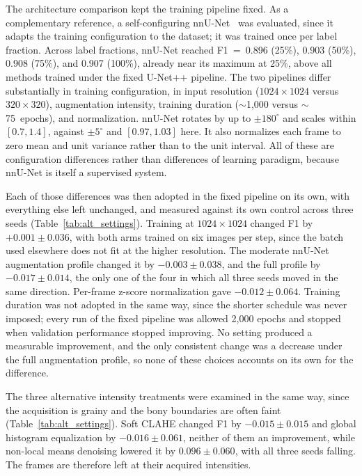\documentclass[
  msc,
  american
]{ThesisPUC_v2}
\begin{document}
The architecture comparison kept the training pipeline fixed. As a complementary reference, a self-configuring nnU-Net~\citep{ref_nnunet} was evaluated, since it adapts the training configuration to the dataset; it was trained once per label fraction. Across label fractions, nnU-Net reached F1~=~0.896 (25\%), 0.903 (50\%), 0.908 (75\%), and 0.907 (100\%), already near its maximum at 25\%, above all methods trained under the fixed U-Net++ pipeline. The two pipelines differ substantially in training configuration, in input resolution ($1024 \times 1024$ versus $320 \times 320$), augmentation intensity, training duration (${\sim}$1{,}000 versus ${\sim}$75~epochs), and normalization. nnU-Net rotates by up to $\pm 180^\circ$ and scales within $[0.7, 1.4]$, against $\pm 5^\circ$ and $[0.97, 1.03]$ here. It also normalizes each frame to zero mean and unit variance rather than to the unit interval. All of these are configuration differences rather than differences of learning paradigm, because nnU-Net is itself a supervised system.

Each of those differences was then adopted in the fixed pipeline on its own, with everything else left unchanged, and measured against its own control across three seeds (Table~\ref{tab:alt_settings}). Training at $1024 \times 1024$ changed F1 by $+0.001 \pm 0.036$, with both arms trained on six images per step, since the batch used elsewhere does not fit at the higher resolution. The moderate nnU-Net augmentation profile changed it by $-0.003 \pm 0.038$, and the full profile by $-0.017 \pm 0.014$, the only one of the four in which all three seeds moved in the same direction. Per-frame z-score normalization gave $-0.012 \pm 0.064$. Training duration was not adopted in the same way, since the shorter schedule was never imposed; every run of the fixed pipeline was allowed 2{,}000 epochs and stopped when validation performance stopped improving. No setting produced a measurable improvement, and the only consistent change was a decrease under the full augmentation profile, so none of these choices accounts on its own for the difference.

The three alternative intensity treatments were examined in the same way, since the acquisition is grainy and the bony boundaries are often faint (Table~\ref{tab:alt_settings}). Soft CLAHE changed F1 by $-0.015 \pm 0.015$ and global histogram equalization by $-0.016 \pm 0.061$, neither of them an improvement, while non-local means denoising lowered it by $0.096 \pm 0.060$, with all three seeds falling. The frames are therefore left at their acquired intensities.
\end{document}
